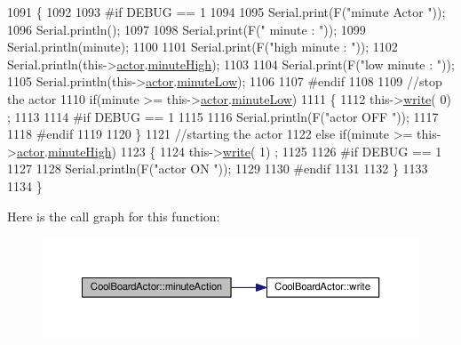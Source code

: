 \begin{DoxyCode}
1091 \{
1092 
1093 \textcolor{preprocessor}{#if DEBUG == 1}
1094     
1095     Serial.print(F(\textcolor{stringliteral}{"minute Actor "}));
1096     Serial.println();
1097 
1098     Serial.print(F(\textcolor{stringliteral}{" minute : "}));
1099     Serial.println(minute);
1100 
1101     Serial.print(F(\textcolor{stringliteral}{"high minute : "}));
1102     Serial.println(this->\hyperlink{class_cool_board_actor_a8f190db9f7a39fddbcef7f152da970e9}{actor}.\hyperlink{struct_cool_board_actor_1_1state_a4bff3d61ead74adb60be224764b93006}{minuteHigh});
1103 
1104     Serial.print(F(\textcolor{stringliteral}{"low minute : "}));
1105     Serial.println(this->\hyperlink{class_cool_board_actor_a8f190db9f7a39fddbcef7f152da970e9}{actor}.\hyperlink{struct_cool_board_actor_1_1state_acbcc2902331fd9d757cd475eb403bdd9}{minuteLow});
1106 
1107 \textcolor{preprocessor}{#endif}
1108 
1109     \textcolor{comment}{//stop the actor    }
1110     \textcolor{keywordflow}{if}(minute >= this->\hyperlink{class_cool_board_actor_a8f190db9f7a39fddbcef7f152da970e9}{actor}.\hyperlink{struct_cool_board_actor_1_1state_acbcc2902331fd9d757cd475eb403bdd9}{minuteLow})
1111     \{
1112         this->\hyperlink{class_cool_board_actor_a958786ff01ea1056ee72c72d439f86da}{write}( 0) ;
1113 
1114 \textcolor{preprocessor}{    #if DEBUG == 1 }
1115 
1116         Serial.println(F(\textcolor{stringliteral}{"actor OFF "}));
1117 
1118 \textcolor{preprocessor}{    #endif  }
1119 
1120     \}   
1121     \textcolor{comment}{//starting the actor}
1122     \textcolor{keywordflow}{else} \textcolor{keywordflow}{if}(minute >= this->\hyperlink{class_cool_board_actor_a8f190db9f7a39fddbcef7f152da970e9}{actor}.\hyperlink{struct_cool_board_actor_1_1state_a4bff3d61ead74adb60be224764b93006}{minuteHigh})
1123     \{
1124         this->\hyperlink{class_cool_board_actor_a958786ff01ea1056ee72c72d439f86da}{write}( 1) ;
1125 
1126 \textcolor{preprocessor}{    #if DEBUG == 1 }
1127 
1128         Serial.println(F(\textcolor{stringliteral}{"actor ON "}));
1129 
1130 \textcolor{preprocessor}{    #endif  }
1131 
1132     \}
1133 
1134 \} 
\end{DoxyCode}
Here is the call graph for this function\+:\nopagebreak
\begin{figure}[H]
\begin{center}
\leavevmode
\includegraphics[width=350pt]{dc/d69/class_cool_board_actor_af000944ce0b9abb9c6ee4b8fe839fb36_cgraph}
\end{center}
\end{figure}
